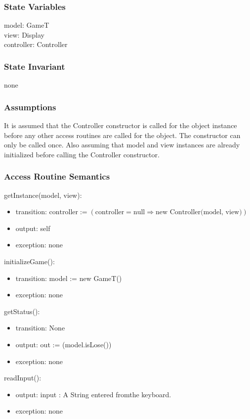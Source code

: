 \documentclass[12pt]{article}
\begin{document}
\subsubsection* {State Variables}

model: GameT\\
view: Display\\
controller: Controller

\subsubsection* {State Invariant}

none

\subsubsection* {Assumptions}

It is assumed that the Controller constructor is called for the object instance before any other access routines are called for the object. The constructor can only be called once. Also assuming that model and view instances are already initialized before calling the Controller constructor. 

\subsubsection* {Access Routine Semantics}

\noindent getInstance(model, view):
\begin{itemize}
\item transition: $\text{controller}:=(\text{controller}=\text{null}\Rightarrow\text{new Controller(model, view)}) $
\item output: self
\item exception: none
\end{itemize}

\noindent initializeGame():
\begin{itemize}
\item transition: model := new GameT()
\item exception: none
\end{itemize}

\noindent getStatus():
\begin{itemize}
\item transition: None
\item output: out := (model.isLose())
\item exception: none
\end{itemize}
\newpage
\noindent readInput():
\begin{itemize}
\item output: input : A String entered fromthe keyboard.
\item exception: none
\end{itemize}
\end{document}
